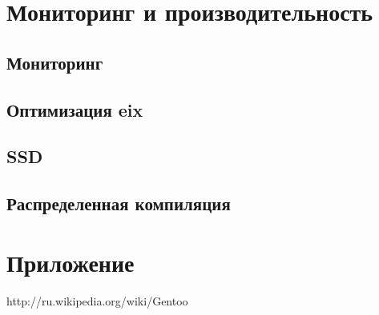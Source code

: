 \documentclass[12pt, a4paper]{article}
\begin{document}
\newpage
\section{Мониторинг и производительность}

\subsection{Мониторинг}

\subsection{Оптимизация eix}

\subsection{SSD}

\subsection{Распределенная компиляция}

\newpage

\section{Приложение}


\newpage
\begin{thebibliography}{99}

	 http://ru.wikipedia.org/wiki/Gentoo
	
	

\end{thebibliography}
\end{document}
